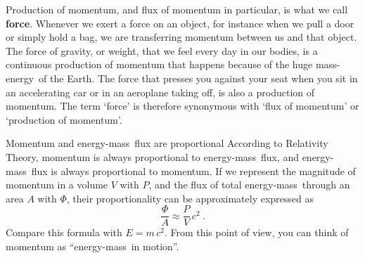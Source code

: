 \documentclass[a4paper,12pt,%
onecolumn,oneside,%
british%
]{memoir}
\renewcommand*{\bm}[1]{\textpdfrender{TextRenderingMode=2,LineWidth=0.2pt}{\boldsymbol{#1}}}
\renewcommand*{\|}[1][]{\nonscript\:#1\vert\nonscript\:\mathopen{}}
\newcommand*{\chap}{Chapter}%
\newcommand*{\energym}{energy-mass}
\newcommand*{\masse}{mass-energy}
\newcommand*{\yc}{c} %
\newcommand*{\ym}{m}%
\newcommand*{\yE}{E}
\newcommand*{\yH}{\varPhi}%
\begin{document}
\medskip

Production of momentum, and flux of momentum in particular, is what we call \textbf{force}. Whenever we exert a force on an object, for instance when we pull a door or simply hold a bag, we are transferring momentum between us and that object. The force of gravity, or weight, that we feel every day in our bodies, is a continuous production of momentum that happens because of the huge \masse\ of the Earth. The force that presses you against your seat when you sit in an accelerating car or in an aeroplane taking off, is also a production of momentum. The term \enquote*{force} is therefore synonymous with \enquote*{flux of momentum} or \enquote*{production of momentum}.



\begin{extra}{Momentum and \energym\ flux are proportional}
  According to Relativity Theory, momentum is always proportional to \energym\ flux, and \energym\ flux is always proportional to momentum. If we represent the magnitude of momentum in a volume $V$ with $P$, and the flux of total \energym\ through an area $A$ with $\yH$, their proportionality can be approximately expressed as
  \begin{equation}
    \label{eq:momentum_heat}
    \frac{\yH}{A} \approx \frac{P}{V}\,\yc^{2} \ .
  \end{equation}
  Compare this formula with $\yE=\ym\,\yc^{2}$. From this point of view, you can think of momentum as \enquote{\energym\ in motion}. %
\end{extra}
\end{document}
